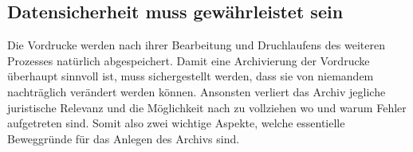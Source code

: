 \subsection{Datensicherheit muss gewährleistet sein}
Die Vordrucke werden nach ihrer Bearbeitung und Druchlaufens des weiteren Prozesses natürlich abgespeichert.
Damit eine Archivierung der Vordrucke überhaupt sinnvoll ist, muss sichergestellt werden, dass sie von niemandem  
nachträglich verändert werden können. Ansonsten verliert das Archiv jegliche juristische Relevanz und die Möglichkeit nach zu vollziehen wo und warum Fehler aufgetreten sind. Somit also zwei wichtige Aspekte, welche essentielle Beweggründe für das Anlegen des Archivs sind.   